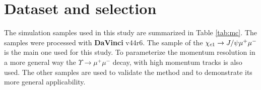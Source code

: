\section{Dataset and selection}
\label{sec:dataset}
 The simulation samples used in this study are summarized in Table
 \ref{tab:mc}. The samples were processed with \textbf{DaVinci}
 v44r6. The sample of the ${\chi_{{c} 1}}
 \rightarrow J/\psi \mu^+ \mu^-$ is the main one used for this
 study. To parameterize  the momentum resolution in a more general way
 the $\Upsilon  \rightarrow \mu^+ \mu^-$ decay, with high momentum
 tracks is also used. The other samples are used to validate the method and
 to demonstrate its more general applicability. 

\begin{table}[htb!]
\caption{\small Simulated data samples used in this study. }
\small
\begin{center}
\end{center}
\end{table}
